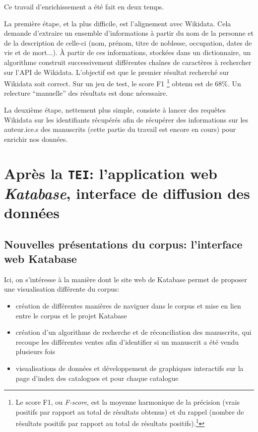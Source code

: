 \documentclass[a4paper, 12pt, twoside]{book}
\newcommand{\tei}{\texttt{TEI}}
\begin{document}
Ce travail d'enrichissement a été fait en deux temps. 

La première étape, et la plus difficile, est l'alignement avec Wikidata. Cela demande d'extraire un ensemble d'informations à partir du nom de la personne et de la description de celle-ci (nom, prénom, titre de noblesse, occupation, dates de vie et de mort...). À partir de ces informations, stockées dans un dictionnaire, un algorithme construit successivement différentes chaînes de caractères à rechercher sur l'API de Wikidata. L'objectif est que le premier résultat recherché sur Wikidata soit correct. Sur un jeu de test, le score F1 \footnote{Le score F1, ou \textit{F-score}, est la moyenne harmonique de la précision (vrais positifs par rapport au total de résultats obtenus) et du rappel (nombre de résultats positifs par rapport au total de résultats positifs).\footcite{noauthor_precision_2022}} obtenu est de 68\%. Un relecture \enquote{manuelle} des résultats est donc nécessaire.

La deuxième étape, nettement plus simple, consiste à lancer des requêtes Wikidata sur les identifiants récupérés afin de récupérer des informations sur les auteur.ice.s des manuscrits (cette partie du travail est encore en cours) pour enrichir nos données.




\part{Après la \tei{}: l'application web \textit{Katabase}, interface de diffusion des données}
\chapter{Nouvelles présentations du corpus: l'interface web Katabase}
Ici, on s'intéresse à la manière dont le site web de Katabase permet de proposer une visualisation différente du corpus:
\begin{itemize}
 \item création de différentes manières de naviguer dans le corpus et mise en lien entre le corpus et le projet Katabase
 \item création d'un algorithme de recherche et de réconciliation des manuscrits, qui recoupe les différentes ventes afin d'identifier si un manuscrit a été vendu plusieurs fois
 \item visualisations de données et développement de graphiques interactifs sur la page d'index des catalogues et pour chaque catalogue
\end{itemize}
\end{document}
